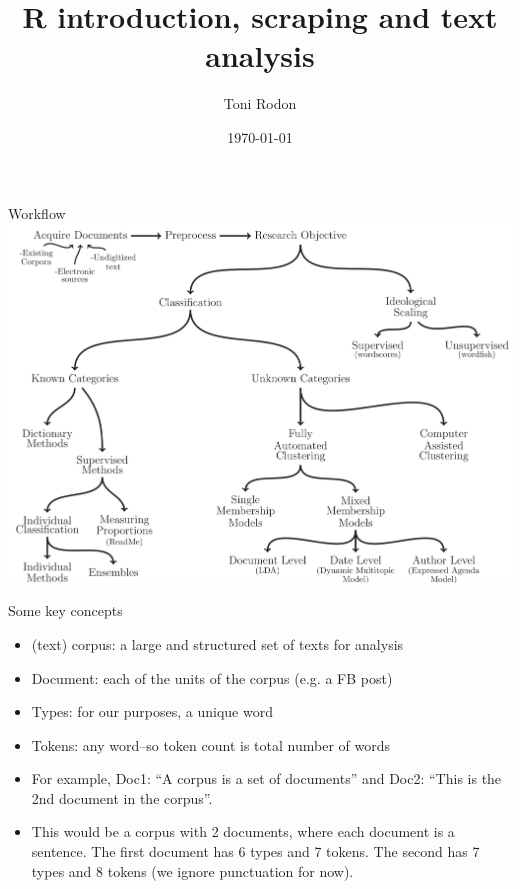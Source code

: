 \documentclass{beamer}
\title{R introduction, scraping and text analysis}
\date{\today}
\author{Toni Rodon}
\institute{Universitat de Barcelona  \\ \faGlobe  \url{www.tonirodon.cat} \\ \faTwitter \href{https://twitter.com/tonirodon}{@tonirodon} }
\begin{document}
  \maketitle


 \begin{frame}{Workflow}
 \centering
 \includegraphics[width=1\textwidth]{../Figures/grimmer.png}
 \end{frame}



\begin{frame}{Some key concepts}
\begin{itemize}[<+->]
\item (text) corpus: a large and structured set of texts for analysis
\item Document: each of the units of the corpus (e.g. a FB post)
\item Types: for our purposes, a unique word
\item Tokens: any word--so token count is total number of words
\item For example, Doc1: ``A corpus is a set of documents'' and Doc2: ``This is the 2nd document in the corpus''.
\item This would be a corpus with 2 documents, where each document is a sentence. The first document has 6 types and 7 tokens. The second has 7 types and 8 tokens (we ignore punctuation for now).
 \end{itemize} 
\end{frame}
\end{document}
